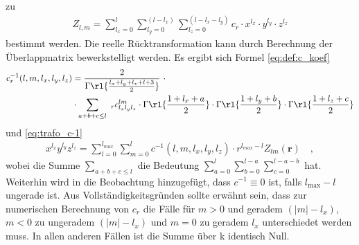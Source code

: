 %
zu 
%
\begin{align}
Z_{l,m}=\sum_{l_x=0}^{l}\sum_{l_y=0}^{(l-l_x)}\sum_{l_z=0}^{(l-l_x-l_y)}c_r\cdot
 x^{l_x}\cdot y^{l_y}\cdot z^{l_z}
\end{align}
%
bestimmt werden. Die reelle Rücktransformation kann durch 
Berechnung der Überlappmatrix bewerkstelligt werden. Es 
ergibt sich Formel \ref{eq:def:c_koef}
%
\begin{align*}\nonumber
c^{-1}_r(l,m,l_x,l_y,l_z)&=\frac{2}{\Gamma\rl{\frac{l_x+l_y+l_z+l+3}{2}}} 
\ \cdot \\ 
&\cdot  \sum_{a+b+c\leq l} \ _rc_{l_xl_yl_z}^{lm}\cdot 
\Gamma\rl{\frac{1+l_x+a}{2}}\cdot 
\Gamma\rl{\frac{1+l_y+b}{2}}\cdot \Gamma\rl{\frac{1+l_z+c}{2}}
\end{align*}
%
und \ref{eq:trafo_c-1}
%
\begin{align*}
x^{l_x}y^{l_y}z^{l_z} = \sum_{l=0}^{l_{max}}\sum_{m=0}^l 
c^{-1}(l,m,l_x,l_y,l_z)\cdot r^{l_{max}-l} Z_{lm}(\textbf{r})\quad,
\end{align*}
 wobei die Summe 
$\sum_{a+b+c\leq 
l}^{}$ die Bedeutung 
$\sum_{a=0}^{l}\sum_{b=0}^{l-a}\sum_{c=0}^{l-a-b}$ hat. Weiterhin wird in 
\cite{av:9a} die Beobachtung hinzugefügt, dass $c^{-1}\equiv0$ ist, falls 
$l_\text{max}-l$ ungerade ist.  Aus 
Vollständigkeitsgründen sollte erwähnt sein, dass zur 
numerischen Berechnung von $c_r$ die Fälle für $m>0$ und 
geradem $(|m|-l_x)$, $m<0$ zu ungeradem $(|m|-l_x)$ und $m=0$ zu 
geradem $l_x$ unterschiedet werden muss. In allen anderen 
Fällen ist die Summe über k identisch Null.


  